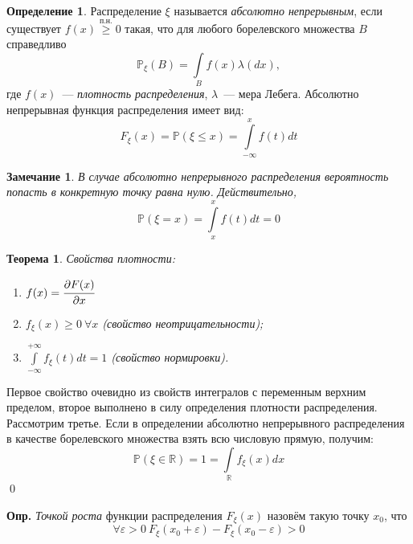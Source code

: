 \documentclass[oneside,final,14pt]{extreport}
\newcommand\mydef{{\bf Опр.}}
\renewenvironment{proof}{{\bfseries Доказательство.}}{\qed}
\newtheorem{thm}{Теорема}[section]
\newtheorem*{rmrk}{Замечание}
\theoremstyle{definition}
\newtheorem{defn}{Определение}[section]
\begin{document}
\begin{defn}
    Распределение $\xi$ называется {\it абсолютно непрерывным}, если существует $f(x) \overset{\text{п.н.}}{\geqslant} 0$ такая, что для любого борелевского множества $B$ справедливо
    \begin{equation*}
        \mathbb{P}_\xi(B) = \int\limits_B f(x) \lambda(dx),
    \end{equation*}
    где $f(x)$~--- {\it плотность распределения}, $\lambda$~--- мера Лебега. Абсолютно непрерывная функция распределения имеет вид:
    \begin{equation*}
        F_\xi(x) = \mathbb{P}(\xi \leqslant x) = \int\limits_{-\infty}^x f(t)dt
    \end{equation*}
\end{defn}
\begin{rmrk}
    В случае абсолютно непрерывного распределения вероятность попасть в конкретную точку равна нулю. Действительно,
    \begin{equation*}
        \mathbb{P}(\xi = x) = \int\limits_{x}^{x} f(t)dt = 0
    \end{equation*}
\end{rmrk}
\begin{thm}
Свойства плотности:
\begin{enumerate}
    \item $f(x) = \cfrac{\partial F(x)}{\partial x}$
    \item $f_\xi(x) \geqslant 0~ \forall x$ (свойство неотрицательности);
    \item $\int\limits_{-\infty}^{+\infty} f_\xi(t) dt = 1$ (свойство нормировки).
\end{enumerate}
\end{thm}
\begin{proof}
    Первое свойство очевидно из свойств интегралов с переменным верхним пределом, второе выполнено в силу определения плотности распределения. Рассмотрим третье. Если в определении абсолютно непрерывного распределения в качестве борелевского множества взять всю числовую прямую, получим: 
    \begin{equation*}
        \mathbb{P}(\xi \in \mathbb{R})=1=\int\limits_{\mathbb{R}} f_{\xi}(x) dx
    \end{equation*}
\end{proof}

\mydef{} {\it Точкой роста} функции распределения $F_\xi(x)$ назовём такую точку $x_0$, что
\begin{equation*}
    \forall \varepsilon > 0~ F_\xi(x_0 + \varepsilon) - F_\xi(x_0 - \varepsilon) > 0
\end{equation*}
\end{document}
